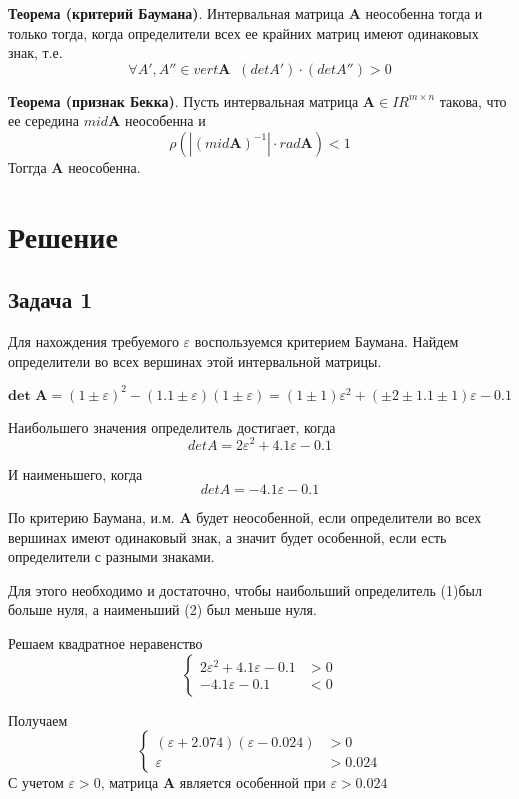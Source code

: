 \documentclass[14pt,a4paper,article]{ncc}
\begin{document}
\textbf{Теорема (критерий Баумана)}. Интервальная матрица \textbf{A} неособенна тогда и только тогда,
когда определители всех ее крайних матриц имеют одинаковых знак, т.е.
$$\forall A', A'' \in vert \textbf{A} \;\; (det A') \cdot (det A'') > 0$$


\textbf{Теорема (признак Бекка)}. Пусть интервальная матрица $\textbf{A} \in IR^{m\times n}$ такова, что ее середина $mid \textbf{A}$ неособенна
и 
$$ \rho(|(mid \textbf{A})^{-1}| \cdot rad \textbf{A}) < 1 $$
Тоггда \textbf{A} неособенна.


\section{Решение}
\subsection{Задача 1}
Для нахождения требуемого $\varepsilon$ воспользуемся критерием Баумана.
Найдем определители во всех вершинах этой интервальной матрицы.

$$\textbf{det A} = (1 \pm \varepsilon)^2 - (1.1 \pm \varepsilon)(1 \pm \varepsilon) = (1 \pm 1)\varepsilon^2 + (\pm 2 \pm 1.1 \pm 1)\varepsilon - 0.1$$

Наибольшего значения определитель достигает, когда 
\begin{equation}
det A = 2\varepsilon^2 + 4.1\varepsilon - 0.1    
\end{equation}

И наименьшего, когда
\begin{equation}
det A = -4.1\varepsilon - 0.1  
\end{equation}

По критерию Баумана, и.м. \textbf{A} будет неособенной, если
определители во всех вершинах имеют одинаковый знак, а значит
будет особенной, если есть определители с разными знаками.

Для этого необходимо и достаточно, чтобы наибольший определитель
(1)был больше нуля, а наименьший (2) был меньше нуля.

Решаем квадратное неравенство
\begin{equation}
 \begin{cases}
   2\varepsilon^2 + 4.1\varepsilon - 0.1 &> 0 \\
   -4.1\varepsilon - 0.1 &< 0
 \end{cases}
\end{equation}

Получаем
\begin{equation}
 \begin{cases}
   (\varepsilon + 2.074)(\varepsilon - 0.024) &> 0 \\
   \varepsilon &> 0.024
 \end{cases}
\end{equation}
С учетом $\varepsilon > 0$, матрица \textbf{A} является особенной
при $\varepsilon > 0.024$
\end{document}
